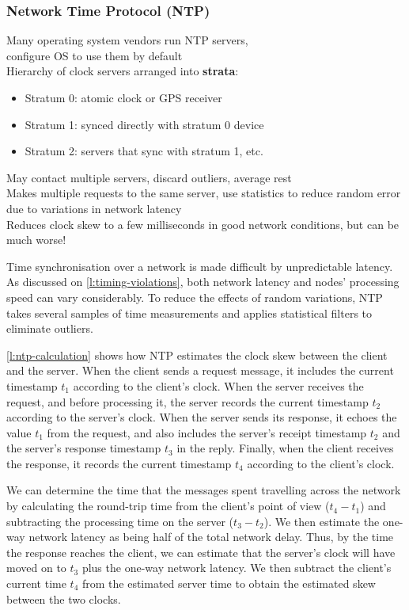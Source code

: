 \begin{frame}
    \label{s:ntp}
    \frametitle{Network Time Protocol (NTP)}
    Many operating system vendors run NTP servers,\\configure OS to use them by default\\[1em]\pause
    Hierarchy of clock servers arranged into \textbf{strata}:
    \begin{itemize}
        \item Stratum 0: atomic clock or GPS receiver
        \item Stratum 1: synced directly with stratum 0 device
        \item Stratum 2: servers that sync with stratum 1, etc.\\[1em]
    \end{itemize}\pause
    May contact multiple servers, discard outliers, average rest\\[1em]
    Makes multiple requests to the same server, use statistics to reduce random error due to variations in network latency\\[1em]
    Reduces clock skew to a few milliseconds in good network conditions, but can be much worse!
\end{frame}
\label{l:ntp}

Time synchronisation over a network is made difficult by unpredictable latency.
As discussed on \autoref{l:timing-violations}, both network latency and nodes' processing speed can vary considerably.
To reduce the effects of random variations, NTP takes several samples of time measurements and applies statistical filters to eliminate outliers.

\autoref{l:ntp-calculation} shows how NTP estimates the clock skew between the client and the server.
When the client sends a request message, it includes the current timestamp $t_1$ according to the client's clock.
When the server receives the request, and before processing it, the server records the current timestamp $t_2$ according to the server's clock.
When the server sends its response, it echoes the value $t_1$ from the request, and also includes the server's receipt timestamp $t_2$ and the server's response timestamp $t_3$ in the reply.
Finally, when the client receives the response, it records the current timestamp $t_4$ according to the client's clock.

We can determine the time that the messages spent travelling across the network by calculating the round-trip time from the client's point of view ($t_4 - t_1$) and subtracting the processing time on the server ($t_3 - t_2$).
We then estimate the one-way network latency as being half of the total network delay.
Thus, by the time the response reaches the client, we can estimate that the server's clock will have moved on to $t_3$ plus the one-way network latency.
We then subtract the client's current time $t_4$ from the estimated server time to obtain the estimated skew between the two clocks.

